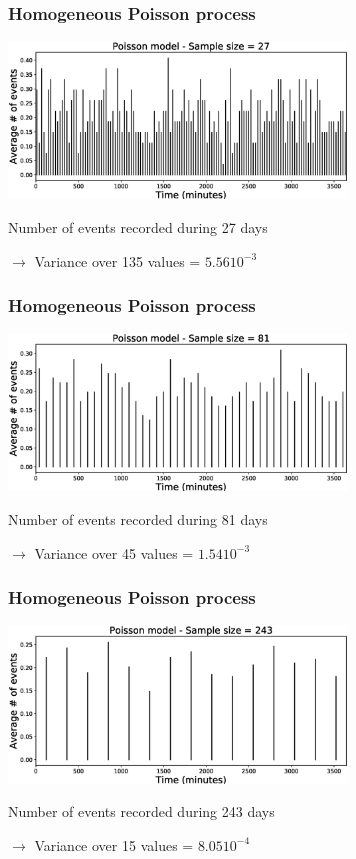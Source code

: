 \documentclass{beamer}
\begin{document}
	\begin{frame}
		\frametitle{Homogeneous Poisson process}
		\begin{center}
			\includegraphics[width=9cm, trim={1cm 0cm 3cm 0cm}, clip]{longrange/Poisson_4.eps}
		\end{center}
		Number of events recorded during 27 days

		$\rightarrow$ Variance over 135 values = $5.56 10^{-3}$
	\end{frame}

	\begin{frame}
		\frametitle{Homogeneous Poisson process}
		\begin{center}
			\includegraphics[width=9cm, trim={1cm 0cm 3cm 0cm}, clip]{longrange/Poisson_5.eps}
		\end{center}
		Number of events recorded during 81 days

		$\rightarrow$ Variance over 45 values = $1.54 10^{-3}$
	\end{frame}

	\begin{frame}
		\frametitle{Homogeneous Poisson process}
		\begin{center}
			\includegraphics[width=9cm, trim={1cm 0cm 3cm 0cm}, clip]{longrange/Poisson_6.eps}
		\end{center}
		Number of events recorded during 243 days

		$\rightarrow$ Variance over 15 values = $8.05 10^{-4}$
	\end{frame}
\end{document}
